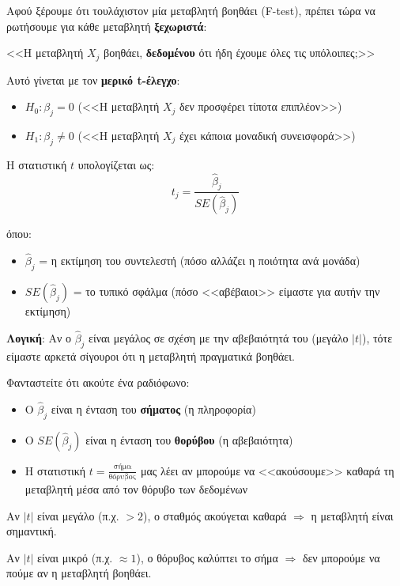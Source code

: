 \documentclass[12pt,a4paper]{article}
\begin{document}
\begin{theorybox}
Αφού ξέρουμε ότι τουλάχιστον μία μεταβλητή βοηθάει (F-test), πρέπει τώρα να ρωτήσουμε για κάθε μεταβλητή \textbf{ξεχωριστά}:

<<Η μεταβλητή $X_j$ βοηθάει, \textbf{δεδομένου} ότι ήδη έχουμε όλες τις υπόλοιπες;>>

Αυτό γίνεται με τον \textbf{μερικό t-έλεγχο}:
\begin{itemize}
    \item $H_0: \beta_j = 0$ (<<Η μεταβλητή $X_j$ δεν προσφέρει τίποτα επιπλέον>>)
    \item $H_1: \beta_j \neq 0$ (<<Η μεταβλητή $X_j$ έχει κάποια μοναδική συνεισφορά>>)
\end{itemize}

Η στατιστική $t$ υπολογίζεται ως:
\begin{equation}
t_j = \frac{\hat{\beta}_j}{SE(\hat{\beta}_j)}
\end{equation}

όπου:
\begin{itemize}
    \item $\hat{\beta}_j$ = η εκτίμηση του συντελεστή (πόσο αλλάζει η ποιότητα ανά μονάδα)
    \item $SE(\hat{\beta}_j)$ = το τυπικό σφάλμα (πόσο <<αβέβαιοι>> είμαστε για αυτήν την εκτίμηση)
\end{itemize}

\textbf{Λογική}: Αν ο $\hat{\beta}_j$ είναι μεγάλος σε σχέση με την αβεβαιότητά του (μεγάλο $|t|$), τότε είμαστε αρκετά σίγουροι ότι η μεταβλητή πραγματικά βοηθάει.
\end{theorybox}

\begin{examplebox}
Φανταστείτε ότι ακούτε ένα ραδιόφωνο:
\begin{itemize}
    \item Ο $\hat{\beta}_j$ είναι η ένταση του \textbf{σήματος} (η πληροφορία)
    \item Ο $SE(\hat{\beta}_j)$ είναι η ένταση του \textbf{θορύβου} (η αβεβαιότητα)
    \item Η στατιστική $t = \frac{\text{σήμα}}{\text{θόρυβος}}$ μας λέει αν μπορούμε να <<ακούσουμε>> καθαρά τη μεταβλητή μέσα από τον θόρυβο των δεδομένων
\end{itemize}

Αν $|t|$ είναι μεγάλο (π.χ. $> 2$), ο σταθμός ακούγεται καθαρά $\Rightarrow$ η μεταβλητή είναι σημαντική.

Αν $|t|$ είναι μικρό (π.χ. $\approx 1$), ο θόρυβος καλύπτει το σήμα $\Rightarrow$ δεν μπορούμε να πούμε αν η μεταβλητή βοηθάει.
\end{examplebox}
\end{document}
